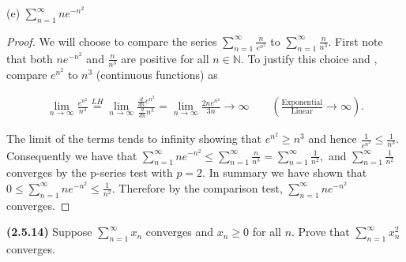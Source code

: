 \documentclass[12pt]{article}
\newcommand{\limtoinf}[1][n]{\displaystyle\lim_{ {#1} \to \infty}}
\newcommand{\paren}[1]{\left( {#1} \right)}
\newcommand{\series}[2]{\displaystyle \sum_{ {#1} }^{ {#2} }}
\newcommand{\bN}{\mathbb{N}}
\begin{document}
\noindent (e) $\series{n=1}{\infty}ne^{-n^2}$

\begin{proof}
	We will choose to compare the series $\series{n=1}{\infty}\frac{n}{e^{n^2}}$ to $\series{n=1}{\infty}\frac{n}{n^3}$. First note that both $ne^{-n^2}$ and $\frac{n}{n^3}$ are positive for all $n\in\bN$. To justify this choice and , compare $e^{n^2}$ to $n^3$ (continuous functions) as
	
\begin{align*}
	\limtoinf\frac{e^{n^2}}{n^3}\overset{LH}{=}\limtoinf\frac{\frac{d}{dn}e^{n^2}}{\frac{d}{dn}n^3}=\limtoinf\frac{2ne^{n^2}}{3n}\to\infty \qquad \paren{\frac{\text{Exponential}}{\text{Linear}}\to\infty}.
\end{align*}

The limit of the terms tends to infinity showing that $e^{n^2}\ge n^3$ and hence $\frac{1}{e^{n^2}}\le\frac{1}{n^3}$. Consequently we have that $\series{n=1}{\infty}ne^{-n^2}\le\series{n=1}{\infty}\frac{n}{n^3}=\series{n=1}{\infty}\frac{1}{n^2},$ and $\series{n=1}{\infty}\frac{1}{n^2}$ converges by the p-series test with $p=2$. In summary we have shown that $0\le\series{n=1}{\infty}ne^{-n^2}\le\frac{1}{n^2}$. Therefore by the comparison test, $\series{n=1}{\infty}ne^{-n^2}$ converges.
\end{proof}

\newpage

\noindent \textbf{(2.5.14)} Suppose $\series{n=1}{\infty}x_n$ converges and $x_n\ge0$ for all $n$. Prove that $\series{n=1}{\infty} x_n^2$ converges.
\end{document}
